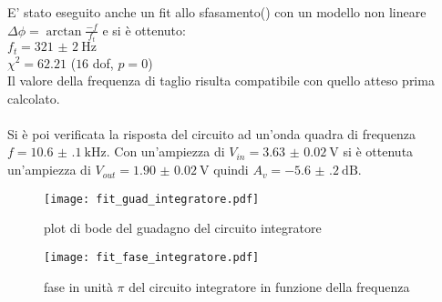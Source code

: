 E' stato eseguito anche un fit allo sfasamento() con un modello non lineare $\Delta \phi= \arctan{\frac{-f}{f_t}}$ e si è ottenuto:\\
$f_t= \SI{321(2)}{\Hz}$\\
$\chi^2=62.21$ ($16$ dof, $p = 0$)\\
Il valore della frequenza di taglio risulta compatibile con quello atteso prima calcolato.\\
\\
Si è poi verificata la risposta del circuito ad un'onda quadra di frequenza $f= \SI{10.6(1)}{\kHz}$. Con un'ampiezza di $V_{in}=\SI{3.63(2)}{\V}$ si è ottenuta un'ampiezza di $V_{out}=\SI{1.90(2)}{\V}$ quindi $A_v=\SI{-5.6(2)}{\dB}$.





\begin{figure}[h]
	\centering
	\texttt{[image: fit\_guad\_integratore.pdf]}
	\caption{plot di bode del guadagno del circuito integratore}
	\label{f:guad_integ}
\end{figure}

\begin{figure}[h]
	\centering
	\texttt{[image: fit\_fase\_integratore.pdf]}
	\caption{fase in unità $\pi$ del circuito integratore in funzione della frequenza}
	\label{f:fase_integ}
\end{figure}
